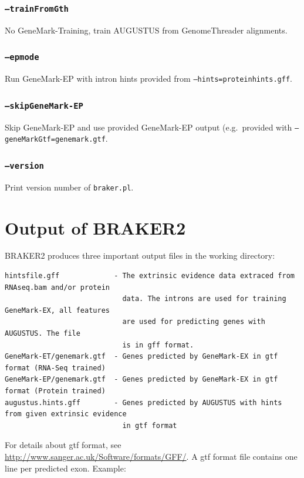 \documentclass[a4paper,10pt]{report}
\begin{document}
    \subsection{\texttt{--trainFromGth}}                       No GeneMark-Training, train AUGUSTUS from GenomeThreader alignments.
    \subsection{\texttt{--epmode}}                             Run GeneMark-EP with intron hints provided from \texttt{--hints=proteinhints.gff}.
    \subsection{\texttt{--skipGeneMark-EP}}                    Skip GeneMark-EP and use provided GeneMark-EP output (e.g.~provided with
                                         \texttt{--geneMarkGtf=genemark.gtf}.
    \subsection{\texttt{--version}}                            Print version number of \texttt{braker.pl}.                          


\chapter{Output of BRAKER2}

BRAKER2 produces three important output files in the working directory:

\begin{verbatim}
hintsfile.gff             - The extrinsic evidence data extraced from RNAseq.bam and/or protein
                            data. The introns are used for training GeneMark-EX, all features
                            are used for predicting genes with AUGUSTUS. The file
                            is in gff format.
GeneMark-ET/genemark.gtf  - Genes predicted by GeneMark-EX in gtf format (RNA-Seq trained)
GeneMark-EP/genemark.gtf  - Genes predicted by GeneMark-EX in gtf format (Protein trained)
augustus.hints.gff        - Genes predicted by AUGUSTUS with hints from given extrinsic evidence
                            in gtf format

\end{verbatim}

For details about gtf format, see \url{http://www.sanger.ac.uk/Software/formats/GFF/}. A gtf format file
contains one line per predicted exon. Example:
\end{document}
